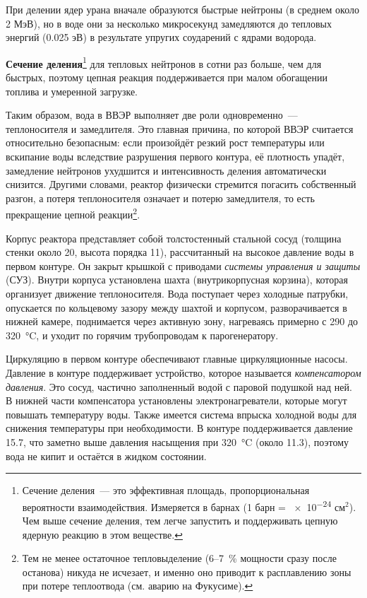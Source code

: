 При делении ядер урана вначале образуются быстрые нейтроны (в среднем около 2 МэВ), но в воде они за несколько микросекунд замедляются до тепловых энергий (\num{0,025} эВ) в результате упругих соударений с ядрами водорода.

\textbf{Сечение деления}\footnote{Сечение деления~--- это эффективная площадь, пропорциональная вероятности взаимодействия. Измеряется в барнах (1 барн = \num{e-24} см$^2$). Чем выше сечение деления, тем легче запустить и поддерживать цепную ядерную реакцию в этом веществе.}  для тепловых нейтронов в сотни раз больше, чем для быстрых, поэтому цепная реакция поддерживается при малом обогащении топлива и умеренной загрузке.

Таким образом, вода в ВВЭР выполняет две роли одновременно~--- теплоносителя и замедлителя. Это главная причина, по которой ВВЭР считается относительно безопасным: если произойдёт резкий рост температуры или вскипание воды вследствие разрушения первого контура, её плотность упадёт, замедление нейтронов ухудшится и интенсивность деления автоматически снизится. Другими словами, реактор физически стремится погасить собственный разгон, а потеря теплоносителя означает и потерю замедлителя, то есть прекращение цепной реакции\footnote{Тем не менее остаточное тепловыделение (\num{6}--\qty{7}{\percent} мощности сразу после останова) никуда не исчезает, и именно оно приводит к расплавлению зоны при потере теплоотвода (см. аварию на Фукусиме).}.

Корпус реактора представляет собой толстостенный стальной сосуд (толщина стенки около \qty{20}{\ruCm}, высота порядка \qty{11}{\ruM}), рассчитанный на высокое давление воды в первом контуре. Он закрыт крышкой с приводами \emph{системы управления и защиты} (СУЗ). Внутри корпуса установлена шахта (внутрикорпусная корзина), которая организует движение теплоносителя. Вода поступает через холодные патрубки, опускается по кольцевому зазору между шахтой и корпусом, разворачивается в нижней камере, поднимается через активную зону, нагреваясь примерно с \num{290} до \qty{320}{\degreeCelsius}, и уходит по горячим трубопроводам к парогенератору.

Циркуляцию в первом контуре обеспечивают главные циркуляционные насосы. Давление в контуре поддерживает устройство, которое называется \emph{компенсатором давления}. Это сосуд, частично заполненный водой с паровой подушкой над ней. В нижней части компенсатора установлены электронагреватели, которые могут повышать температуру воды. Также имеется система впрыска холодной воды для снижения температуры при необходимости. В контуре поддерживается давление \qty{15,7}{\ruMPa}, что заметно выше давления насыщения при \qty{320}{\degreeCelsius} (около \qty{11,3}{\ruMPa}), поэтому вода не кипит и остаётся в жидком состоянии.


